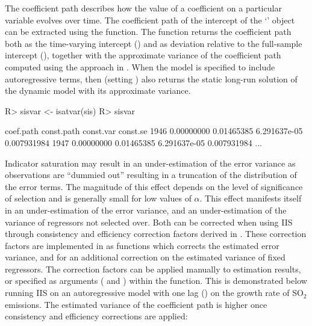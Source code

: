 \documentclass[article,nojss]{jss}
\begin{document}
The coefficient path describes how the value of a coefficient on a
particular variable evolves over time. The coefficient path of the
intercept of the `' object can be extracted using the
 function. The function returns the coefficient path
both as the time-varying intercept () and as
deviation relative to the full-sample intercept (),
together with the approximate variance of the coefficient path
computed using the approach in \cite{pretis2015istest}. When the model
is specified to include autoregressive terms, then 
(setting ) also returns the static long-run solution
of the dynamic model with its approximate variance.
%
\begin{CodeChunk}
\begin{CodeInput}
R> sisvar <- isatvar(sis)
R> sisvar
\end{CodeInput}
\begin{CodeOutput}
       coef.path  const.path    const.var    const.se
1946  0.00000000  0.01465385 6.291637e-05 0.007931984
1947  0.00000000  0.01465385 6.291637e-05 0.007931984
...
\end{CodeOutput}
\end{CodeChunk}
%
Indicator saturation may result in an under-estimation of the error
variance as observations are ``dummied out'' resulting in a truncation
of the distribution of the error terms. The magnitude of this effect
depends on the level of significance of selection and is generally
small for low values of $\alpha$. This effect manifests itself in an
under-estimation of the error variance, and an under-estimation of the
variance of regressors not selected over. Both can be corrected when
using IIS through consistency and efficiency correction factors
derived in \cite{johansen2016asymptotic}. These correction factors are
implemented in  as functions  which corrects
the estimated error variance, and  for an additional
correction on the estimated variance of fixed regressors. The
correction factors can be applied manually to estimation results, or
specified as arguments ( and
) within the  function. This is
demonstrated below running IIS on an autoregressive model with one lag
() on the growth rate of SO$_2$ emissions. The estimated
variance of the coefficient path is higher once consistency and
efficiency corrections are applied:
%
\end{document}
